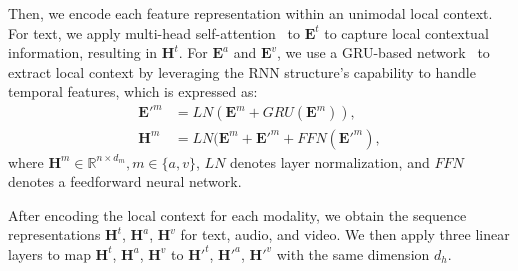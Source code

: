 \documentclass[11pt]{article}
\begin{document}
Then, we encode each feature representation within an unimodal local context.
For text, we apply multi-head self-attention~\cite{self-attention} to $\bm{E}^t$ to capture local contextual information, resulting in $\bm{H}^t$.
For $\bm{E}^a$ and $\bm{E}^v$, we use a GRU-based network~\cite{CFN-ESA} to extract local context by leveraging the RNN structure’s capability to handle temporal features, which is expressed as:
\begin{equation}
\begin{aligned}
\bm{E}'^m &= LN(\bm{E}^m + GRU(\bm{E}^m)), \\
\bm{H}^m &= LN(\bm{E}^m + \bm{E}'^m + FFN(\bm{E}'^m),
\end{aligned}
\end{equation}
where $\bm{H}^m \in \mathbb{R}^{n \times d_m},m \in \{a,v\}$, $LN$ denotes layer normalization, and $FFN$ denotes a feedforward neural network.

After encoding the local context for each modality, we obtain the sequence representations $\bm{H}^t$, $\bm{H}^a$, $\bm{H}^v$ for text, audio, and video.
We then apply three linear layers to map $\bm{H}^t$, $\bm{H}^a$, $\bm{H}^v$ to $\bm{H}'^t$, $\bm{H}'^a$, $\bm{H}'^v$ with the same dimension $d_h$.
\end{document}
